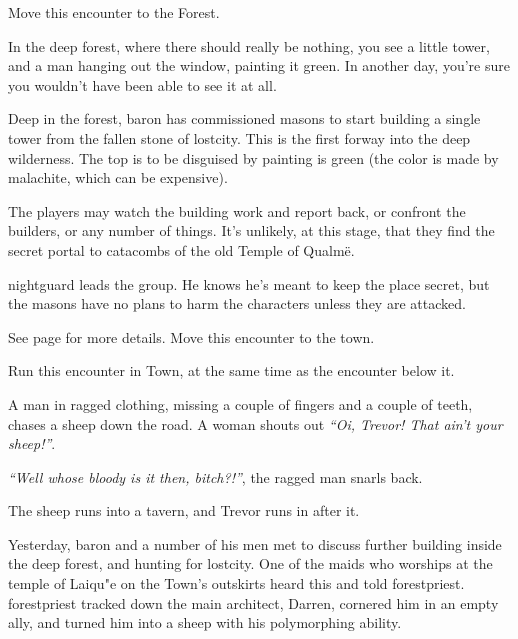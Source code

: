 \begin{multicols}{2}
Move this encounter to the Forest.


\begin{boxtext}

	In the deep forest, where there should really be nothing, you see a little tower, and a man hanging out the window, painting it green.  In another day, you're sure you wouldn't have been able to see it at all.

\end{boxtext}

Deep in the forest, \gls{baron} has commissioned masons to start building a single tower from the fallen stone of \gls{lostcity}. This is the first forway into the deep wilderness.  The top is to be disguised by painting is green (the color is made by malachite, which can be expensive).

The players may watch the building work and report back, or confront the builders, or any number of things.  It's unlikely, at this stage, that they find the secret portal to catacombs of the old Temple of Qualm\"{e}.

\gls{nightguard} leads the group.  He knows he's meant to keep the place secret, but the masons have no plans to harm the characters unless they are attacked.

See page \pageref{green_tower} for more details.  Move this encounter to the town.


Run this encounter in Town, at the same time as the encounter below it.

\begin{boxtext}
	A man in ragged clothing, missing a couple of fingers and a couple of teeth, chases a sheep down the road.  A woman shouts out \emph{``Oi, Trevor! That ain't your sheep!''}.

	\emph{``Well whose bloody is it then, bitch?!''}, the ragged man snarls back.

	The sheep runs into a tavern, and Trevor runs in after it.
\end{boxtext}

Yesterday, \gls{baron} and a number of his men met to discuss further building inside the deep forest, and hunting for \gls{lostcity}.  One of the maids who worships at the temple of Laiqu"{e} on the Town's outskirts heard this and told \gls{forestpriest}.  \Gls{forestpriest} tracked down the main architect, Darren, cornered him in an empty ally, and turned him into a sheep with his polymorphing ability.


\end{multicols}
